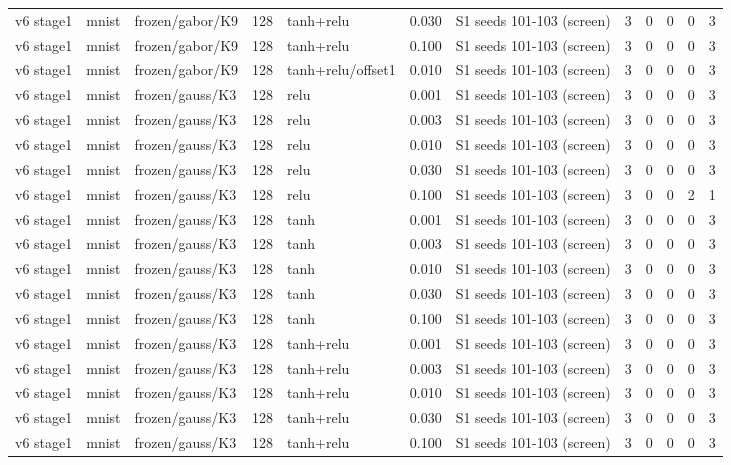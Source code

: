 \begin{table}[htbp]
{\begin{tabular}{@{}lllrlrlrrrrr@{}}
v6 stage1 & mnist & frozen/gabor/K9 & 128 & tanh+relu & 0.030 & S1 seeds 101-103 (screen) & 3 & 0 & 0 & 0 & 3 \\
v6 stage1 & mnist & frozen/gabor/K9 & 128 & tanh+relu & 0.100 & S1 seeds 101-103 (screen) & 3 & 0 & 0 & 0 & 3 \\
v6 stage1 & mnist & frozen/gabor/K9 & 128 & tanh+relu/offset1 & 0.010 & S1 seeds 101-103 (screen) & 3 & 0 & 0 & 0 & 3 \\
v6 stage1 & mnist & frozen/gauss/K3 & 128 & relu & 0.001 & S1 seeds 101-103 (screen) & 3 & 0 & 0 & 0 & 3 \\
v6 stage1 & mnist & frozen/gauss/K3 & 128 & relu & 0.003 & S1 seeds 101-103 (screen) & 3 & 0 & 0 & 0 & 3 \\
v6 stage1 & mnist & frozen/gauss/K3 & 128 & relu & 0.010 & S1 seeds 101-103 (screen) & 3 & 0 & 0 & 0 & 3 \\
v6 stage1 & mnist & frozen/gauss/K3 & 128 & relu & 0.030 & S1 seeds 101-103 (screen) & 3 & 0 & 0 & 0 & 3 \\
v6 stage1 & mnist & frozen/gauss/K3 & 128 & relu & 0.100 & S1 seeds 101-103 (screen) & 3 & 0 & 0 & 2 & 1 \\
v6 stage1 & mnist & frozen/gauss/K3 & 128 & tanh & 0.001 & S1 seeds 101-103 (screen) & 3 & 0 & 0 & 0 & 3 \\
v6 stage1 & mnist & frozen/gauss/K3 & 128 & tanh & 0.003 & S1 seeds 101-103 (screen) & 3 & 0 & 0 & 0 & 3 \\
v6 stage1 & mnist & frozen/gauss/K3 & 128 & tanh & 0.010 & S1 seeds 101-103 (screen) & 3 & 0 & 0 & 0 & 3 \\
v6 stage1 & mnist & frozen/gauss/K3 & 128 & tanh & 0.030 & S1 seeds 101-103 (screen) & 3 & 0 & 0 & 0 & 3 \\
v6 stage1 & mnist & frozen/gauss/K3 & 128 & tanh & 0.100 & S1 seeds 101-103 (screen) & 3 & 0 & 0 & 0 & 3 \\
v6 stage1 & mnist & frozen/gauss/K3 & 128 & tanh+relu & 0.001 & S1 seeds 101-103 (screen) & 3 & 0 & 0 & 0 & 3 \\
v6 stage1 & mnist & frozen/gauss/K3 & 128 & tanh+relu & 0.003 & S1 seeds 101-103 (screen) & 3 & 0 & 0 & 0 & 3 \\
v6 stage1 & mnist & frozen/gauss/K3 & 128 & tanh+relu & 0.010 & S1 seeds 101-103 (screen) & 3 & 0 & 0 & 0 & 3 \\
v6 stage1 & mnist & frozen/gauss/K3 & 128 & tanh+relu & 0.030 & S1 seeds 101-103 (screen) & 3 & 0 & 0 & 0 & 3 \\
v6 stage1 & mnist & frozen/gauss/K3 & 128 & tanh+relu & 0.100 & S1 seeds 101-103 (screen) & 3 & 0 & 0 & 0 & 3 \\

\end{tabular}}
\end{table}

